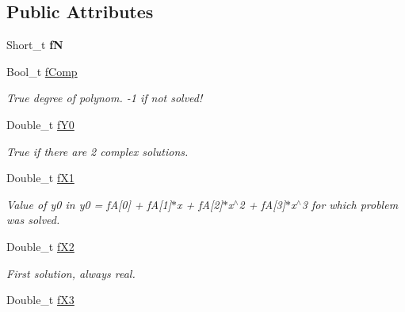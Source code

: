 \subsection*{Public Attributes}
\begin{DoxyCompactItemize}
\item 
\hypertarget{classTPoly3_afaa7abb90e0653763604ff6f4b8efc3b}{
Short\_\-t {\bfseries fN}}
\label{classTPoly3_afaa7abb90e0653763604ff6f4b8efc3b}

\item 
\hypertarget{classTPoly3_a3dc0d4394ef760c5072e8e6b0933331c}{
Bool\_\-t \hyperlink{classTPoly3_a3dc0d4394ef760c5072e8e6b0933331c}{fComp}}
\label{classTPoly3_a3dc0d4394ef760c5072e8e6b0933331c}

\begin{DoxyCompactList}\small\item\em True degree of polynom. -\/1 if not solved! \item\end{DoxyCompactList}\item 
\hypertarget{classTPoly3_ac9c53f6c8af563503ca09045fc8c3ea4}{
Double\_\-t \hyperlink{classTPoly3_ac9c53f6c8af563503ca09045fc8c3ea4}{fY0}}
\label{classTPoly3_ac9c53f6c8af563503ca09045fc8c3ea4}

\begin{DoxyCompactList}\small\item\em True if there are 2 complex solutions. \item\end{DoxyCompactList}\item 
\hypertarget{classTPoly3_aebd6dc68db307343fa743ae9b00c4cdf}{
Double\_\-t \hyperlink{classTPoly3_aebd6dc68db307343fa743ae9b00c4cdf}{fX1}}
\label{classTPoly3_aebd6dc68db307343fa743ae9b00c4cdf}

\begin{DoxyCompactList}\small\item\em Value of y0 in y0 = fA\mbox{[}0\mbox{]} + fA\mbox{[}1\mbox{]}$\ast$x + fA\mbox{[}2\mbox{]}$\ast$x$^\wedge$2 + fA\mbox{[}3\mbox{]}$\ast$x$^\wedge$3 for which problem was solved. \item\end{DoxyCompactList}\item 
\hypertarget{classTPoly3_ac41f956e14b0b71bc62772fd9ae61887}{
Double\_\-t \hyperlink{classTPoly3_ac41f956e14b0b71bc62772fd9ae61887}{fX2}}
\label{classTPoly3_ac41f956e14b0b71bc62772fd9ae61887}

\begin{DoxyCompactList}\small\item\em First solution, always real. \item\end{DoxyCompactList}\item 
\hypertarget{classTPoly3_a41354b337bbcbdda1211cf4f2669496a}{
Double\_\-t \hyperlink{classTPoly3_a41354b337bbcbdda1211cf4f2669496a}{fX3}}
\label{classTPoly3_a41354b337bbcbdda1211cf4f2669496a}


\end{DoxyCompactItemize}
